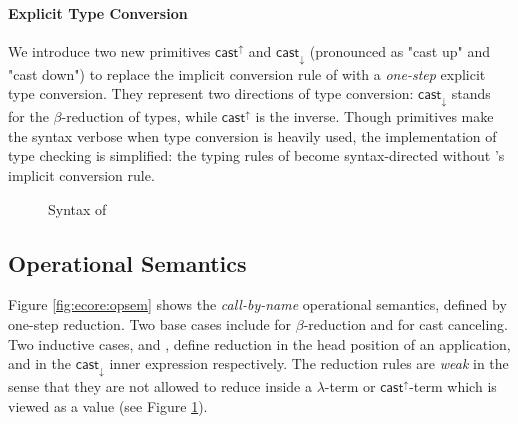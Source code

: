 \paragraph{Explicit Type Conversion}

We introduce two new primitives $ \mathsf{cast}^{\uparrow} $ and $ \mathsf{cast}_{\downarrow} $
(pronounced as "cast up" and "cast down") to replace the implicit
conversion rule of \cc with a \emph{one-step} explicit type
conversion. They represent two directions of type conversion:
$ \mathsf{cast}_{\downarrow} $ stands for the $\beta$-reduction of types, while
$ \mathsf{cast}^{\uparrow} $ is the inverse. %
Though \cast primitives make the syntax verbose when type conversion
is heavily used, the implementation of type checking is simplified:
the typing rules of \ecore become syntax-directed without \cc's
implicit conversion rule. 

\begin{figure}
    \gram{\ottec\ottinterrule
        \ottG\ottinterrule
        \ottv}
    \caption{Syntax of \ecore}
    \label{fig:ecore:syntax}
\end{figure}

\subsection{Operational Semantics}\label{sec:ecore:opsem}

Figure \ref{fig:ecore:opsem} shows the \emph{call-by-name} operational
semantics, defined by one-step reduction. Two base cases include
 for $\beta$-reduction and 
for cast canceling. Two inductive cases,  and
, define reduction in the head position of an
application, and in the $ \mathsf{cast}_{\downarrow} $ inner expression
respectively. The reduction rules are \emph{weak} in the sense that they
are not allowed to reduce inside a $\lambda$-term or $ \mathsf{cast}^{\uparrow} $-term
which is viewed as a value (see Figure \ref{fig:ecore:syntax}).

